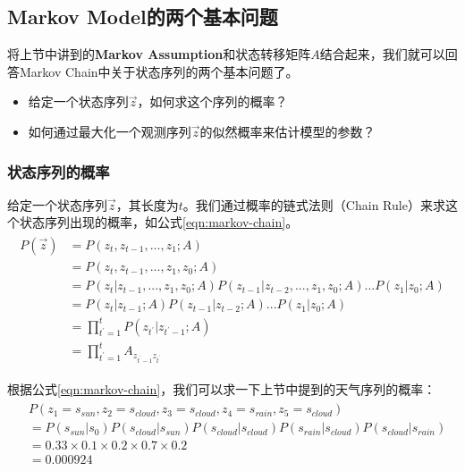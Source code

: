 \subsection{Markov Model的两个基本问题}
将上节中讲到的{\bf Markov Assumption}和状态转移矩阵$A$结合起来，我们就可以回答Markov Chain中关于状态序列的两个基本问题了。
\begin{itemize}
  \item 给定一个状态序列$\vec{z}$，如何求这个序列的概率？
  \item 如何通过最大化一个观测序列$\vec{z}$的似然概率来估计模型的参数？
\end{itemize}

\subsubsection{状态序列的概率}
给定一个状态序列$\vec{z}$，其长度为$t$。我们通过概率的链式法则（Chain Rule）来求这个状态序列出现的概率，如公式\ref{eqn:markov-chain}。
\begin{align}
\label{eqn:markov-chain}
\begin{split}
  P(\vec{z}) &= P(z_{t}, z_{t-1}, ...,z_{1};A) \\
             &= P(z_{t}, z_{t-1}, ...,z_{1}, z_{0};A) \\
             &= P(z_{t}|z_{t-1}, ...,z_{1}, z_{0};A)P(z_{t-1}|z_{t-2}, ...,z_{1}, z_{0};A)...P(z_1|z_0;A) \\
             &= P(z_{t}|z_{t-1};A)P(z_{t-1}|z_{t-2};A)...P(z_1|z_0;A) \\
             &= \prod_{t^{'}=1}^{t} P(z_{t^{'}}|z_{t^{'}-1};A)  \\
             &= \prod_{t^{'}=1}^{t} A_{z_{t^{'}-1}z_{t^{'}}}
\end{split}
\end{align}

根据公式\ref{eqn:markov-chain}，我们可以求一下上节中提到的天气序列的概率：
\begin{align}
\label{eqn:markov-chain-example}
\begin{split}
&P(z_1=s_{sun}, z_2=s_{cloud}, z_3=s_{cloud}, z_4=s_{rain}, z_5=s_{cloud}) \\
      &= P(s_{sun}|s_0)P(s_{cloud}|s_{sun})P(s_{cloud}|s_{cloud})P(s_{rain}|s_{cloud})P(s_{cloud}|s_{rain}) \\
      &= 0.33 \times 0.1 \times 0.2 \times 0.7 \times 0.2 \\
      &= 0.000924‬
\end{split}
\end{align}

